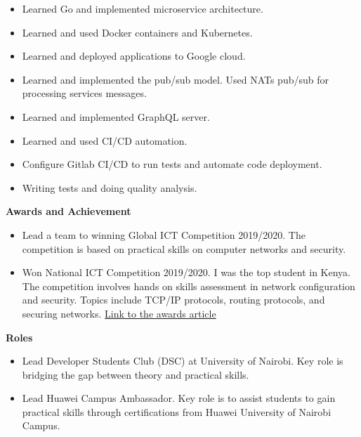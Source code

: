 \documentclass[a4paper]{article}
\begin{document}
\begin{itemize}[noitemsep]
    \item Learned Go and implemented microservice architecture.
    \item Learned and used Docker containers and Kubernetes.
    \item Learned and deployed applications to Google cloud.
    \item Learned and implemented the pub/sub model. Used NATs pub/sub for processing services messages.
    \item Learned and implemented GraphQL server.
    \item Learned and used CI/CD automation.
    \item Configure Gitlab CI/CD to run tests and automate code deployment.
    \item Writing tests and doing quality analysis.
\end{itemize}

\begin{center}
    {\Large \textbf{Awards and Achievement}}
\end{center}

\begin{itemize}[noitemsep]
    \item Lead a team to winning Global ICT Competition 2019/2020. The competition is based on practical skills on computer networks and security.
    \item Won National ICT Competition 2019/2020. I was the top student in Kenya. The competition involves hands on skills assessment in network configuration and security. Topics include TCP/IP protocols, routing protocols, and securing networks. \href{https://www.uonbi.ac.ke/news/uon-student-wins-huawei-network-cloud-track-award}{Link to the awards article}
\end{itemize}

\begin{center}
    {\Large \textbf{Roles}}
\end{center}

\begin{itemize}[noitemsep]
    \item Lead Developer Students Club (DSC) at University of Nairobi. Key role is bridging the gap between theory and practical skills.
    \item Lead Huawei Campus Ambassador. Key role is to assist students to gain practical skills through certifications from Huawei University of Nairobi Campus.
\end{itemize}
\end{document}

